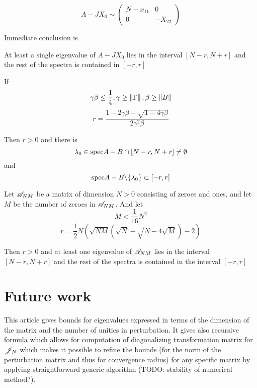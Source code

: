 \documentclass{article}
\begin{document}
\[
    A-JX_0 \sim
    \left(
\begin{array}{c|c}
    N-x_{11} & 0 \\
    \hline
    0        & -X_{22}
\end{array}
\right)
\]

Immediate conclusion is
\begin{propose}
    At least a single eigenvalue of \( A-JX_0 \) lies in the interval \( \left[N-r,N+r\right] \)
    and the rest of the spectra is contained in \( \left[-r,r\right] \)
\end{propose}

\begin{thm}
    If
    \[\gamma\beta\leq\frac14, \gamma\geq\left\|{\Gamma}\right\|, \beta\geq\left\|{B}\right\|\]
    \[r = \frac{1 - 2\gamma\beta - \sqrt{1-4\gamma\beta}}{2 \gamma^2 \beta}\]

    Then $r>0$ and there is
	\[ \lambda_0\in\mathrm{spec} {A-B} \cap \left[N-r,N+r\right] \neq\emptyset \]
	and
	\[ \mathrm{spec} {A-B}\backslash\{\lambda_0\} \subset \left[-r,r\right] \]
\end{thm}
\begin{corollary}
    Let \( \mathscr{A}_{{N}{M}} \) be a matrix of dimension \( N>0 \) consisting of zeroes and ones,
    and let \( M \) be the number of zeroes in \( \mathscr{A}_{{N}{M}} \).
    And let
    \[ M < \frac{1}{16} N^2 \]
    \[ r = \frac12 N
        \left(
        \sqrt{NM}(\sqrt{N} - \sqrt{N-4\sqrt{M}}) - 2
        \right) \]

    Then $r>0$ and at least one eigenvalue of \( \mathscr{A}_{{N}{M}} \) lies in the interval \(\left[N-r,N+r\right]\)
	and the rest of the spectra is contained in the interval \( \left[-r,r\right] \)
\end{corollary}

\section{Future work}
This article gives bounds for eigenvalues expressed in terms of the dimension of the matrix and the number of unities in perturbation.
It gives also recursive formula which allows for computation of diagonalizing transformation matrix for \( \mathscr{J}_{N} \)
which makes it possible to refine the bounds (for the norm of the perturbation matrix and thus for convergence radius)
for any specific matrix by applying straightforward generic algorithm (TODO: stability of numerical method?).
\end{document}
